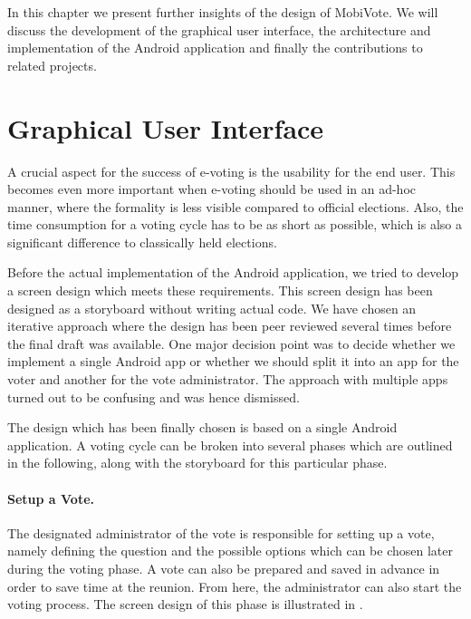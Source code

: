 \documentclass[numbers=noenddot, abstract=on, a4paper, headsepline,
footsepline, oneside, draft=off]{scrreprt}
\begin{document}
In this chapter we present further insights of the design of MobiVote. We
will discuss the development of the graphical user interface, the architecture
and implementation of the Android application and finally the contributions to
related projects.

\section{Graphical User Interface}
\label{sec:gui}
A crucial aspect for the success of e-voting is the usability for the end user.
This becomes even more important when e-voting should be used in an ad-hoc
manner, where the formality is less visible compared to official elections.
Also, the time consumption for a voting cycle has to be as short as possible,
which is also a significant difference to classically held elections.

Before the actual implementation of the Android application, we tried to develop
a screen design which meets these requirements. This screen design has been
designed as a storyboard without writing actual code. We have chosen an
iterative approach where the design has been peer reviewed several times before
the final draft was available. One major decision point was to decide whether we
implement a single Android app or whether we should split it into an app for the
voter and another for the vote administrator. The approach with multiple apps
turned out to be confusing and was hence dismissed.

The design which has been finally chosen is based on a single Android
application. A voting cycle can be broken into several phases which are outlined
in the following, along with the storyboard for this particular phase.

\paragraph{Setup a Vote.}
The designated administrator of the vote is responsible for setting up a vote,
namely defining the question and the possible options which can be chosen later
during the voting phase. A vote can also be prepared and saved in advance in
order to save time at the reunion. From here, the administrator can also
start the voting process. The screen design of this phase is illustrated in
.
\end{document}
